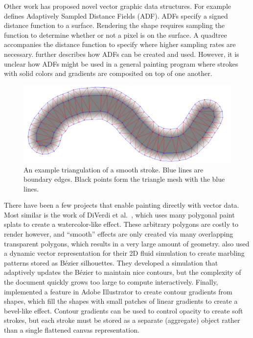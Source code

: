 \documentclass[review]{acmsiggraph}
\begin{document}
Other work has proposed novel vector graphic data structures. For example \cite{Frisken:2000:ASD:344779.344899}
defines Adaptively Sampled Distance Fields (ADF). ADFs specify a signed distance function to a surface.
Rendering the shape requires sampling the function to determine whether or not a pixel is on the surface.
A quadtree accompanies the distance function to specify where higher sampling rates are necessary. \cite{Bremer:2001:VCM}
further describes how ADFs can be created and used. However, it is unclear how ADFs might be used in a general
painting program where strokes with solid colors and gradients are composited on top of one another.

\begin{figure}
    \centering
        \includegraphics[width=\columnwidth]{images/stroke}
    \caption{An example triangulation of a smooth stroke. Blue lines are boundary edges. Black points form the triangle
    mesh with the blue lines.}
    \label{fig:stroke}
\end{figure}

There have been a few projects that enable painting directly with vector data.  Most similar is the work of DiVerdi et al.~, which uses many polygonal paint splats to create a watercolor-like effect.  These arbitrary polygons are costly to render however, and ``smooth'' effects are only created via many overlapping transparent polygons, which results in a very large amount of geometry.  \cite{ando2010} also used a dynamic vector representation for their 2D fluid simulation to create marbling patterns stored as B\'{e}zier silhouettes.  They developed a simulation that adaptively updates the B\'{e}zier to maintain nice contours, but the complexity of the document quickly grows too large to compute interactively.  Finally, \cite{asente2013} implemented a feature in Adobe Illustrator to create contour gradients from shapes, which fill the shapes with small patches of linear gradients to create a bevel-like effect.  Contour gradients can be used to control opacity to create soft strokes, but each stroke must be stored as a separate (aggregate) object rather than a single flattened canvas representation.
\end{document}
